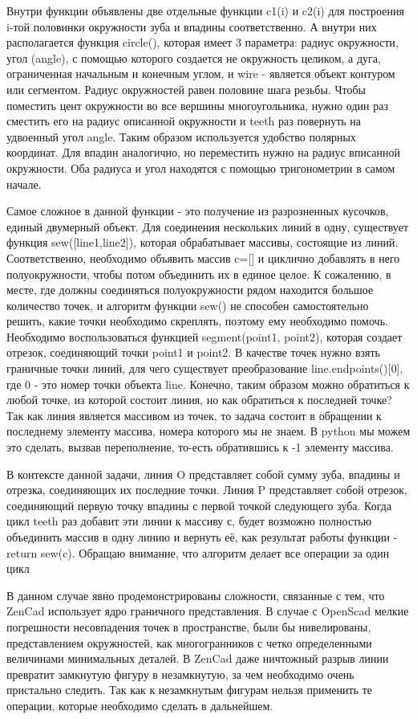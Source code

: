 Внутри функции объявлены две отдельные функции c1(i) и c2(i) для построения i-той половинки окружности зуба и впадины соответственно. А внутри них располагается функция circle(), которая имеет 3 параметра: радиус окружности, угол (angle), с помощью которого создается не окружность целиком, а дуга, ограниченная начальным и конечным углом, и wire - является объект контуром или сегментом. Радиус окружностей равен половине шага резьбы. Чтобы поместить цент окружности во все вершины многоугольника, нужно один раз сместить его на радиус описанной окружности и teeth раз повернуть на удвоенный угол angle. Таким образом используется удобство полярных координат. Для впадин аналогично, но переместить нужно на радиус вписанной окружности. Оба радиуса и угол находятся с помощью тригонометрии в самом начале.

Самое сложное в данной функции - это получение из разрозненных кусочков, единый двумерный объект. Для соединения нескольких линий в одну, существует функция sew([line1,line2]), которая обрабатывает массивы, состоящие из линий. Соответственно, необходимо объявить массив c=[] и циклично добавлять в него полуокружности, чтобы потом объединить их в единое целое. К сожалению, в месте, где должны соединяться полуокружности рядом находится большое количество точек, и алгоритм функции sew() не способен самостоятельно решить, какие точки необходимо скреплять, поэтому ему необходимо помочь. Необходимо воспользоваться функцией segment(point1, point2), которая создает отрезок, соединяющий точки point1 и point2. В качестве точек нужно взять граничные точки линий, для чего существует преобразование line.endpoints()[0], где 0 - это номер точки объекта line. Конечно, таким образом можно обратиться к любой точке, из которой состоит линия, но как обратиться к последней точке? Так как линия является массивом из точек, то задача состоит в обращении к последнему элементу массива, номера которого мы не знаем. В python мы можем это сделать, вызвав переполнение, то-есть обратившись к -1 элементу массива.

В контексте данной задачи, линия O представляет собой сумму зуба, впадины и отрезка, соединяющих их последние точки. Линия P представляет собой отрезок, соединяющий первую точку впадины с первой точкой следующего зуба. Когда цикл teeth раз добавит эти линии к массиву с, будет возможно полностью объединить массив в одну линию и вернуть её, как результат работы функции - return sew(c). Обращаю внимание, что алгоритм делает все операции за один цикл 

В данном случае явно продемонстрированы сложности, связанные с тем, что ZenCad использует ядро граничного представления. В случае с OpenScad мелкие погрешности несовпадения точек в пространстве, были бы нивелированы, представлением окружностей, как многогранников с четко определенными величинами минимальных деталей. В ZenCad даже ничтожный разрыв линии превратит замкнутую фигуру в незамкнутую, за чем необходимо очень пристально следить. Так как к незамкнутым фигурам нельзя применить те операции, которые необходимо сделать в дальнейшем.

